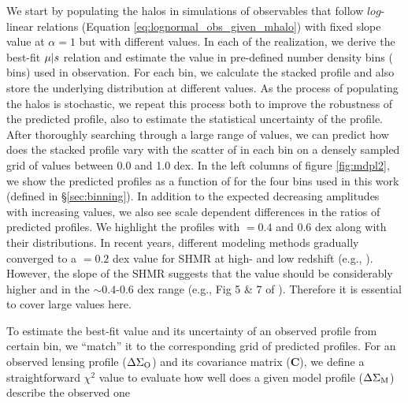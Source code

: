 \documentclass[fleqn,usenatbib,useAMS,english]{mnras}
\begin{document}
    We start by populating the halos in simulations of observables that follow $log$-linear
    relations (Equation \ref{eq:lognormal_obs_given_mhalo}) with fixed slope value at $\alpha =
    1$ but with different \scatterObsSymMhalo{} values.
    In each of the realization, we derive the best-fit $\mu | s$ relation and estimate the
    \scatterMhaloObsSym{} value in pre-defined number density bins (\topn{} bins) used in
    observation.
    For each \topn{} bin, we calculate the stacked \dsigma{} profile and also store the
    underlying \mhalo{} distribution at different \scatterMhaloObsSym{} values.
    As the process of populating the halos is stochastic, we repeat this process both to improve
    the robustness of the predicted \dsigma{} profile, also to estimate the statistical
    uncertainty of the profile.
    After thoroughly searching through a large range of \scatterObsSymMhalo{} values, we can
    predict how does the stacked \dsigma{} profile vary with the scatter of \mhalo{} in each
    \topn{} bin on a densely sampled grid of \scatterMhaloObsSym{} values between 0.0 and 1.0
    dex.
    In the left columns of figure \ref{fig:mdpl2}, we show the predicted \dsigma{} profiles as a
    function of \scatterMhaloObsSym{} for the four \topn{} bins used in this work (defined in
    \S\ref{sec:binning}).
    In addition to the expected decreasing \dsigma{} amplitudes with increasing
    \scatterMhaloObsSym{} values, we also see scale dependent differences in the ratios of
    predicted \dsigma{} profiles.
    We highlight the \dsigma{} profiles with \scatterMhaloObsSym{}$=0.4$ and 0.6 dex along with
    their \mhalo{} distributions.
    In recent years, different modeling methods gradually converged to a
    \scatterObsSymMhalo{}$=0.2$ dex value for SHMR at high-\mhalo{} and low redshift (e.g.,
    \citealt{More2011, Leauthaud2012, Reddick2013, Behroozi2013, Tinker2017}).
    However, the slope of the SHMR suggests that the \scatterMhaloObsSym{} value should be
    considerably higher and in the $\sim 0.4$-0.6 dex range (e.g., Fig 5 \& 7 of
    \citealt{Wechsler2018}). Therefore it is essential to cover large \scatterMhaloObsSym{}
    values here.

    To estimate the best-fit \scatterMhaloObsSym{} value and its uncertainty of an observed
    \dsigma{} profile from certain \topn{} bin, we ``match'' it to the corresponding grid of
    predicted \dsigma{} profiles.
    For an observed lensing profile ($\Delta\Sigma_{\rm O}$) and its covariance matrix
    ($\boldsymbol{C}$), we define a straightforward $\chi^2$ value to evaluate how well does a
    given model profile ($\Delta\Sigma_{\rm M}$) describe the observed one
\end{document}
